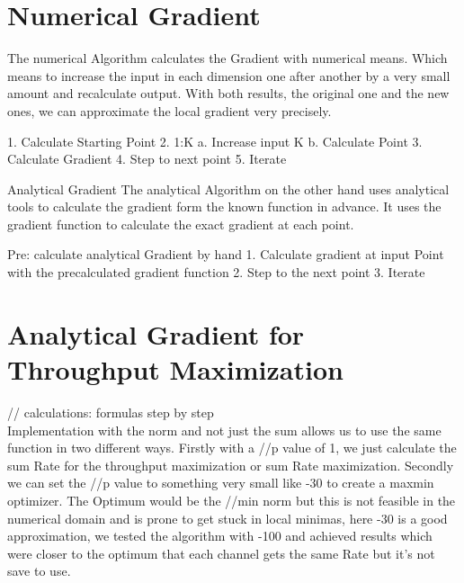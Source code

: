 \section{Numerical Gradient}
The numerical Algorithm calculates the Gradient with numerical means. Which means to increase the input in each dimension one after another by a very small amount and recalculate output. With both results, the original one and the new ones, we can approximate the local gradient very precisely.
\begin{algorithm}
	1.	Calculate Starting Point
	2.	1:K 
	a.	Increase input K
	b.	Calculate Point
	3.	Calculate Gradient
	4.	Step to next point
	5.	Iterate
\end{algorithm}
Analytical Gradient
The analytical Algorithm on the other hand uses analytical tools to calculate the gradient form the known function in advance. It uses the gradient function to calculate the exact gradient at each point.
\begin{algorithm}
	Pre: calculate analytical Gradient by hand
	1.	Calculate gradient at input Point with the precalculated gradient function
	2.	Step to the next point
	3.	Iterate
\end{algorithm}

\section{Analytical Gradient for Throughput Maximization}
// calculations: formulas step by step\\
Implementation with the norm and not just the sum allows us to use the same function in two different ways. Firstly with a //p value of 1, we just calculate the sum Rate for the throughput maximization or sum Rate maximization. Secondly we can set the //p value to something very small like -30 to create a maxmin optimizer. The Optimum would be the //min norm but this is not feasible in the numerical domain and is prone to get stuck in local minimas, here -30 is a good approximation, we tested the algorithm with -100 and achieved results which were closer to the optimum that each channel gets the same Rate but it’s not save to use.

